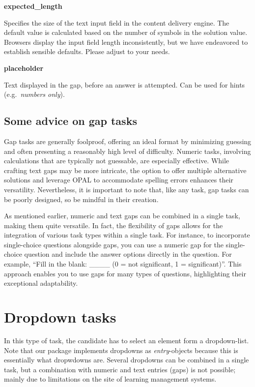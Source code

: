 \documentclass[twoside]{tufte-book}
\begin{document}
\noindent\textbf{expected\_length}\label{expected_length-1}

Specifies the size of the text input field in the content delivery engine. The default value is calculated based on the number of symbols in the solution value. Browsers display the input field length inconsistently, but we have endeavored to establish sensible defaults. Please adjust to your needs.

\noindent\textbf{placeholder}\label{placeholder-1}

Text displayed in the gap, before an answer is attempted. Can be used for hints (e.g.~\emph{numbers only}).

\section{Some advice on gap tasks}\label{some-advice-on-gap-tasks}

Gap tasks are generally foolproof, offering an ideal format by minimizing guessing and often presenting a reasonably high level of difficulty. Numeric tasks, involving calculations that are typically not guessable, are especially effective. While crafting text gaps may be more intricate, the option to offer multiple alternative solutions and leverage OPAL to accommodate spelling errors enhances their versatility. Nevertheless, it is important to note that, like any task, gap tasks can be poorly designed, so be mindful in their creation.

As mentioned earlier, numeric and text gaps can be combined in a single task, making them quite versatile. In fact, the flexibility of gaps allows for the integration of various task types within a single task. For instance, to incorporate single-choice questions alongside gaps, you can use a numeric gap for the single-choice question and include the answer options directly in the question. For example, ``Fill in the blank: \_\_\_\_ (0 = not significant, 1 = significant)''. This approach enables you to use gaps for many types of questions, highlighting their exceptional adaptability.

\chapter{Dropdown tasks}\label{dropdown-tasks}

In this type of task, the candidate has to select an element form a dropdown-list. Note that our package implements dropdowns as \emph{entry}-objects because this is essentially what dropwdowns are. Several dropdowns can be combined in a single task, but a combination with numeric and text entries (gaps) is not possible; mainly due to limitations on the site of learning management systems.
\end{document}

